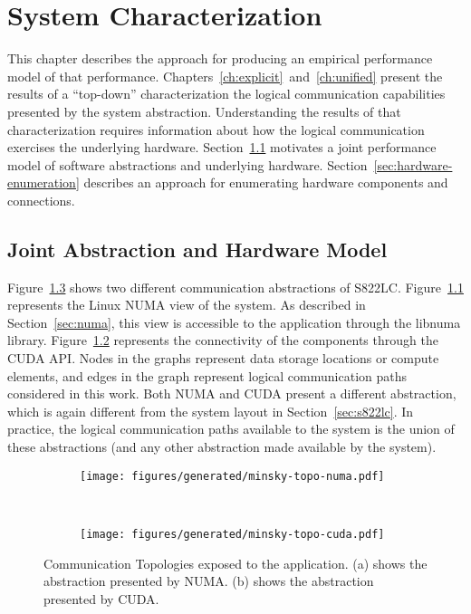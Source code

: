 \chapter{System Characterization}
\label{ch:sys-char}

This chapter describes the approach for producing an empirical performance model of that performance.
Chapters~\ref{ch:explicit}~and~\ref{ch:unified} present the results of a ``top-down'' characterization the logical communication capabilities presented by the system abstraction.
Understanding the results of that characterization requires information about how the logical communication exercises the underlying hardware.
Section~\ref{sec:abstraction-hardware} motivates a joint performance model of software abstractions and underlying hardware.
Section~\ref{sec:hardware-enumeration} describes an approach for enumerating hardware components and connections.

\section{Joint Abstraction and Hardware Model}
\label{sec:abstraction-hardware}

Figure~\ref{fig:minsky-abstraction} shows two different communication abstractions of S822LC.
Figure~\ref{fig:minsky-topo-numa} represents the Linux NUMA view of the system.
As described in Section~\ref{sec:numa}, this view is accessible to the application through the libnuma library.
Figure~\ref{fig:minsky-topo-cuda} represents the connectivity of the components through the CUDA API.
Nodes in the graphs represent data storage locations or compute elements, and edges in the graph represent logical communication paths considered in this work.
Both NUMA and CUDA present a different abstraction, which is again different from the system layout in Section~\ref{sec:s822lc}.
In practice, the logical communication paths available to the system is the union of these abstractions (and any other abstraction made available by the system).

\begin{figure}[ht]
    \centering
    \begin{subfigure}[b]{0.45\textwidth}
        \texttt{[image: figures/generated/minsky-topo-numa.pdf]}
        \caption{}
        \label{fig:minsky-topo-numa}
    \end{subfigure}
    ~
    \begin{subfigure}[b]{0.45\textwidth}
        \texttt{[image: figures/generated/minsky-topo-cuda.pdf]}
        \caption{}
        \label{fig:minsky-topo-cuda}
    \end{subfigure}
    \caption[Communication Topologies Exposed to Application]{
        Communication Topologies exposed to the application.
        (a) shows the abstraction presented by NUMA.
        (b) shows the abstraction presented by CUDA.
    }
    \label{fig:minsky-abstraction}
\end{figure}

